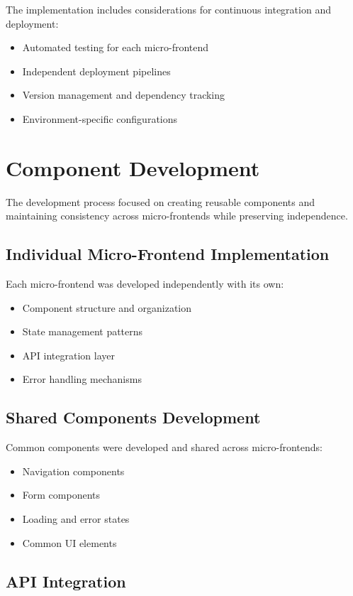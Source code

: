 \documentclass[12pt,a4paper]{report}
\begin{document}
The implementation includes considerations for continuous integration and deployment:
\begin{itemize}
    \item Automated testing for each micro-frontend
    \item Independent deployment pipelines
    \item Version management and dependency tracking
    \item Environment-specific configurations
\end{itemize}

\section{Component Development}

The development process focused on creating reusable components and maintaining consistency across micro-frontends while preserving independence.

\subsection{Individual Micro-Frontend Implementation}

Each micro-frontend was developed independently with its own:
\begin{itemize}
    \item Component structure and organization
    \item State management patterns
    \item API integration layer
    \item Error handling mechanisms
\end{itemize}

\subsection{Shared Components Development}

Common components were developed and shared across micro-frontends:
\begin{itemize}
    \item Navigation components
    \item Form components
    \item Loading and error states
    \item Common UI elements
\end{itemize}

\subsection{API Integration}
\end{document}
